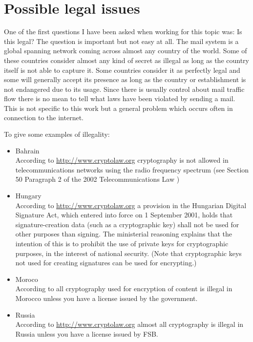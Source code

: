 \section{Possible legal issues}
One of the first questions I have been asked when working for this topic was: Is this legal? The question is important but not easy at all. The mail system is a global spanning network coming across almost any country of the world. Some of these countries consider almost any kind of secret as illegal as long as the country itself is not able to capture it. Some countries consider it as perfectly legal and some will generally accept its presence as long as the country or establishment is not endangered due to its usage. Since there is usually control about mail traffic flow there is no mean to tell what laws have been violated by sending a mail. This is not specific to this work but a general problem which occurs often in connection to the internet.\par

To give some examples of illegality:
\begin{itemize}
\item Bahrain\\
According to \url{http://www.cryptolaw.org} cryptography is not allowed in telecommunications networks using the radio frequency spectrum (see Section 50 Paragraph 2 of the 2002 Telecommunications Law \cite{BAHRAIN})
\item Hungary\\
According to \url{http://www.cryptolaw.org} a provision in the Hungarian Digital Signature Act, which entered into force on 1 September 2001, holds that signature-creation data (such as a cryptographic key) shall not be used for other purposes than signing. The ministerial reasoning explains that the intention of this is to prohibit the use of private keys for cryptographic purposes, in the interest of national security. (Note that cryptographic keys not used for creating signatures can be used for encrypting.)
\item Moroco\\
According to \cite{MAROCO} all cryptography used for encryption of content is illegal in Morocco unless you have a license issued by the government.
\item Russia\\
According to \url{http://www.cryptolaw.org} almost all cryptography is illegal in  Russia unless you have a license issued by FSB.
\end{itemize}
